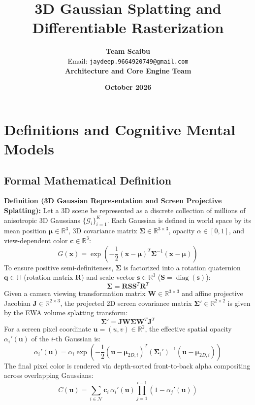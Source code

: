 \documentclass[11pt,a4paper]{article}
\title{\textbf{3D Gaussian Splatting and Differentiable Rasterization}}
\author{\textbf{Team Scaibu} \\ \small Email: \texttt{jaydeep.9664920749@gmail.com} \\ \small \textbf{Architecture and Core Engine Team}}
\date{\textbf{October 2026}}
\theoremstyle{definition}
\begin{document}
\maketitle

\section{Definitions and Cognitive Mental Models}

\subsection{Formal Mathematical Definition}
\textbf{Definition (3D Gaussian Representation and Screen Projective Splatting):}
Let a 3D scene be represented as a discrete collection of millions of anisotropic 3D Gaussians $\{\mathcal{G}_i\}_{i=1}^K$. Each Gaussian is defined in world space by its mean position $\boldsymbol{\mu} \in \mathbb{R}^3$, 3D covariance matrix $\boldsymbol{\Sigma} \in \mathbb{R}^{3 \times 3}$, opacity $\alpha \in [0, 1]$, and view-dependent color $\mathbf{c} \in \mathbb{R}^3$:
{\boldmath
\begin{equation}
G(\mathbf{x}) = \exp\left( -\frac{1}{2} (\mathbf{x} - \boldsymbol{\mu})^T \boldsymbol{\Sigma}^{-1} (\mathbf{x} - \boldsymbol{\mu}) \right)
\end{equation}
}
To ensure positive semi-definiteness, $\boldsymbol{\Sigma}$ is factorized into a rotation quaternion $\mathbf{q} \in \mathbb{H}$ (rotation matrix $\mathbf{R}$) and scale vector $\mathbf{s} \in \mathbb{R}^3$ ($\mathbf{S} = \operatorname{diag}(\mathbf{s})$):
{\boldmath
\begin{equation}
\boldsymbol{\Sigma} = \mathbf{R} \mathbf{S} \mathbf{S}^T \mathbf{R}^T
\end{equation}
}
Given a camera viewing transformation matrix $\mathbf{W} \in \mathbb{R}^{3 \times 3}$ and affine projective Jacobian $\mathbf{J} \in \mathbb{R}^{2 \times 3}$, the projected 2D screen covariance matrix $\boldsymbol{\Sigma}' \in \mathbb{R}^{2 \times 2}$ is given by the EWA volume splatting transform:
{\boldmath
\begin{equation}
\boldsymbol{\Sigma}' = \mathbf{J} \mathbf{W} \boldsymbol{\Sigma} \mathbf{W}^T \mathbf{J}^T
\end{equation}
}
For a screen pixel coordinate $\mathbf{u} = (u, v) \in \mathbb{R}^2$, the effective spatial opacity $\alpha_i'(\mathbf{u})$ of the $i$-th Gaussian is:
{\boldmath
\begin{equation}
\alpha_i'(\mathbf{u}) = \alpha_i \exp\left( -\frac{1}{2} (\mathbf{u} - \boldsymbol{\mu}_{2D, i})^T (\boldsymbol{\Sigma}_i')^{-1} (\mathbf{u} - \boldsymbol{\mu}_{2D, i}) \right)
\end{equation}
}
The final pixel color is rendered via depth-sorted front-to-back alpha compositing across overlapping Gaussians:
{\boldmath
\begin{equation}
C(\mathbf{u}) = \sum_{i \in \mathcal{N}} \mathbf{c}_i \, \alpha_i'(\mathbf{u}) \prod_{j=1}^{i-1} \left( 1 - \alpha_j'(\mathbf{u}) \right)
\end{equation}
}
\end{document}
